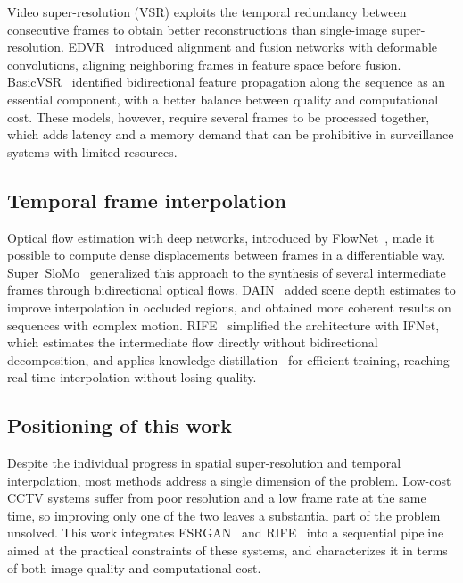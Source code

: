 \documentclass[conference]{IEEEtran}
\begin{document}
Video super-resolution (VSR) exploits the temporal redundancy between consecutive frames to obtain better reconstructions than single-image super-resolution. EDVR~\cite{wang2019edvr} introduced alignment and fusion networks with deformable convolutions, aligning neighboring frames in feature space before fusion. BasicVSR~\cite{chan2021basicvsr} identified bidirectional feature propagation along the sequence as an essential component, with a better balance between quality and computational cost. These models, however, require several frames to be processed together, which adds latency and a memory demand that can be prohibitive in surveillance systems with limited resources.

\subsection{Temporal frame interpolation}

Optical flow estimation with deep networks, introduced by FlowNet~\cite{dosovitskiy2015flownet}, made it possible to compute dense displacements between frames in a differentiable way. Super~SloMo~\cite{jiang2018superslomo} generalized this approach to the synthesis of several intermediate frames through bidirectional optical flows. DAIN~\cite{bao2019dain} added scene depth estimates to improve interpolation in occluded regions, and obtained more coherent results on sequences with complex motion. RIFE~\cite{huang2022rife} simplified the architecture with IFNet, which estimates the intermediate flow directly without bidirectional decomposition, and applies knowledge distillation~\cite{hinton2015distilling} for efficient training, reaching real-time interpolation without losing quality.

\subsection{Positioning of this work}

Despite the individual progress in spatial super-resolution and temporal interpolation, most methods address a single dimension of the problem. Low-cost CCTV systems suffer from poor resolution and a low frame rate at the same time, so improving only one of the two leaves a substantial part of the problem unsolved. This work integrates ESRGAN~\cite{wang2018esrgan} and RIFE~\cite{huang2022rife} into a sequential pipeline aimed at the practical constraints of these systems, and characterizes it in terms of both image quality and computational cost.
\end{document}
